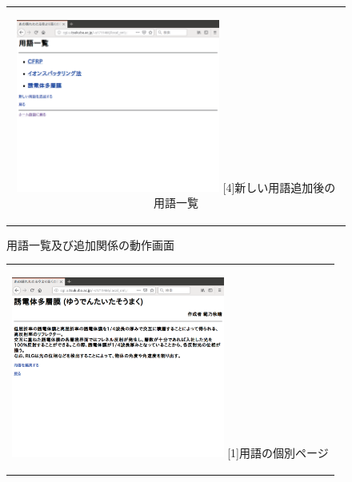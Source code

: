\documentclass[12pt,a4paper]{jarticle}
\begin{document}
\begin{ttfamily}
\begin{figure}[htbp]
\begin{center}
\begin{tabular}{c}
      \begin{minipage}{0.55\hsize}
        \begin{center}
          \includegraphics[width=6.7cm]{10-3-10.eps}
          \hspace{1.6cm} [4]新しい用語追加後の用語一覧
        \end{center}
      \end{minipage}

    \end{tabular}
    \caption{用語一覧及び追加関係の動作画面}
    \label{fig:b}
  \end{center}
\end{figure}

\begin{figure}[htbp]
  \begin{center}
    \begin{tabular}{c}

      \begin{minipage}{0.55\hsize}
        \begin{center}
          \includegraphics[width=7.0cm]{10-3-11.eps}
          \hspace{1.6cm} [1]用語の個別ページ
        \end{center}
      \end{minipage}


\end{tabular}
\end{center}
\end{figure}
\end{ttfamily}
\end{document}

